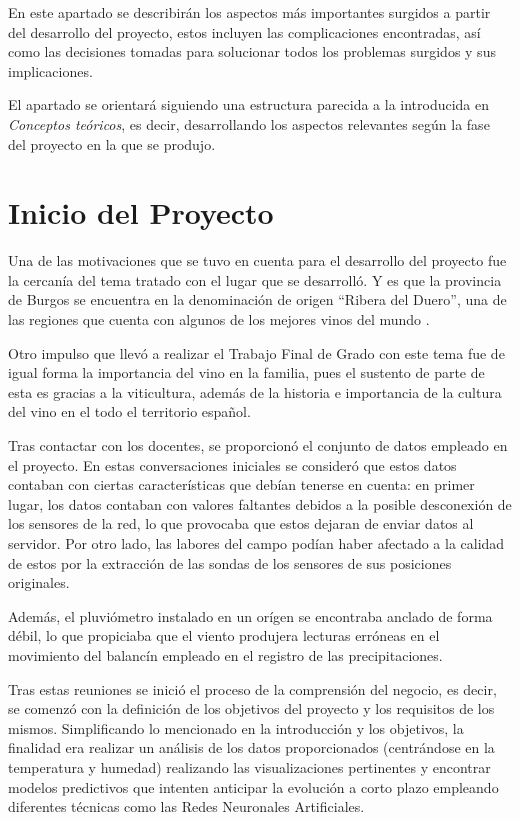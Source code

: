 
En este apartado se describirán los aspectos más importantes surgidos a partir del desarrollo del proyecto,
estos incluyen las complicaciones encontradas, así como las decisiones tomadas para solucionar todos los
problemas surgidos y sus implicaciones.

El apartado se orientará siguiendo una estructura parecida a la introducida en \textit{Conceptos teóricos}, 
es decir, desarrollando los aspectos relevantes según la fase del proyecto en la que se produjo.

\section{Inicio del Proyecto}
Una de las motivaciones que se tuvo en cuenta para el desarrollo del proyecto fue la cercanía del tema tratado
con el lugar que se desarrolló. Y es que la provincia de Burgos se encuentra en la denominación de
origen ``Ribera del Duero'', una de las regiones que cuenta con algunos de los mejores vinos del mundo \cite{misc:abc2021}.

Otro impulso que llevó a realizar el Trabajo Final de Grado con este tema fue de igual forma la importancia 
del vino en la familia, pues el sustento de parte de esta es gracias a la viticultura, además de la historia
e importancia de la cultura del vino en el todo el territorio español.

Tras contactar con los docentes, se proporcionó el conjunto de datos empleado en el proyecto. En estas conversaciones
iniciales se consideró que estos datos contaban con ciertas características que debían tenerse en cuenta: en primer lugar,
los datos contaban con valores faltantes debidos a la posible desconexión de los sensores de la red, lo que provocaba
que estos dejaran de enviar datos al servidor. Por otro lado, las labores del campo podían haber afectado a la calidad
de estos por la extracción de las sondas de los sensores de sus posiciones originales.

Además, el pluviómetro instalado en un orígen se encontraba anclado de forma débil, lo que propiciaba que el viento 
produjera lecturas erróneas en el movimiento del balancín empleado en el registro de las precipitaciones.

Tras estas reuniones se inició el proceso de la comprensión del negocio, es decir, se comenzó con la definición de los 
objetivos del proyecto y los requisitos de los mismos. Simplificando lo mencionado en la introducción y los objetivos,
la finalidad era realizar un análisis de los datos proporcionados (centrándose en la temperatura y humedad) realizando
las visualizaciones pertinentes y encontrar modelos predictivos que intenten anticipar la evolución a corto plazo
empleando diferentes técnicas como las Redes Neuronales Artificiales.

